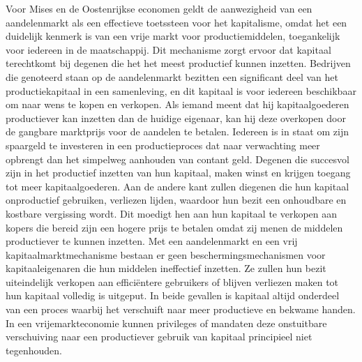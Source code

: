 \documentclass[
  a5paper,
  smalldemyvopaper,11pt,twoside,onecolumn,openright,extrafontsizes,
hidelinks]{memoir}
\begin{document}
Voor Mises en de Oostenrijkse economen geldt de aanwezigheid van een
aandelenmarkt als een effectieve toetssteen voor het kapitalisme, omdat
het een duidelijk kenmerk is van een vrije markt voor productiemiddelen,
toegankelijk voor iedereen in de maatschappij. Dit mechanisme zorgt
ervoor dat kapitaal terechtkomt bij degenen die het het meest productief
kunnen inzetten. Bedrijven die genoteerd staan op de aandelenmarkt
bezitten een significant deel van het productiekapitaal in een
samenleving, en dit kapitaal is voor iedereen beschikbaar om naar wens
te kopen en verkopen. Als iemand meent dat hij kapitaalgoederen
productiever kan inzetten dan de huidige eigenaar, kan hij deze
overkopen door de gangbare marktprijs voor de aandelen te betalen.
Iedereen is in staat om zijn spaargeld te investeren in een
productieproces dat naar verwachting meer opbrengt dan het simpelweg
aanhouden van contant geld. Degenen die succesvol zijn in het productief
inzetten van hun kapitaal, maken winst en krijgen toegang tot meer
kapitaalgoederen. Aan de andere kant zullen diegenen die hun kapitaal
onproductief gebruiken, verliezen lijden, waardoor hun bezit een
onhoudbare en kostbare vergissing wordt. Dit moedigt hen aan hun
kapitaal te verkopen aan kopers die bereid zijn een hogere prijs te
betalen omdat zij menen de middelen productiever te kunnen inzetten. Met
een aandelenmarkt en een vrij kapitaalmarktmechanisme bestaan er geen
beschermingsmechanismen voor kapitaaleigenaren die hun middelen
ineffectief inzetten. Ze zullen hun bezit uiteindelijk verkopen aan
efficiëntere gebruikers of blijven verliezen maken tot hun kapitaal
volledig is uitgeput. In beide gevallen is kapitaal altijd onderdeel van
een proces waarbij het verschuift naar meer productieve en bekwame
handen. In een vrijemarkteconomie kunnen privileges of mandaten deze
onstuitbare verschuiving naar een productiever gebruik van kapitaal
principieel niet tegenhouden.
\end{document}
